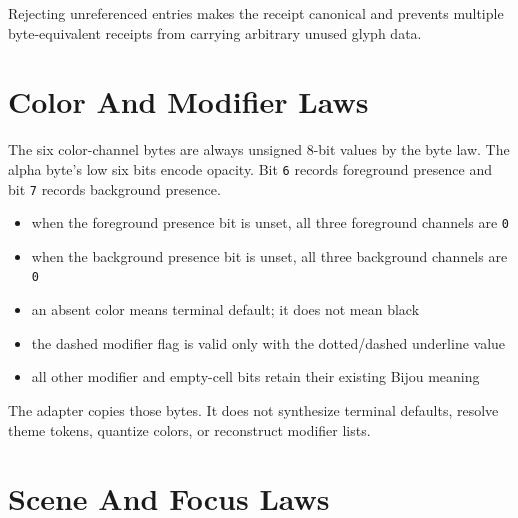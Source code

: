 Rejecting unreferenced entries makes the receipt canonical and prevents multiple byte-equivalent receipts from carrying arbitrary unused glyph data.

\section{Color And Modifier Laws}\label{record-164-color-and-modifier-laws}

The six color-channel bytes are always unsigned 8-bit values by the byte law. The alpha byte's low six bits encode opacity. Bit \texttt{6} records foreground presence and bit \texttt{7} records background presence.

\begin{itemize}
\tightlist
\item
  when the foreground presence bit is unset, all three foreground channels are \texttt{0}
\item
  when the background presence bit is unset, all three background channels are \texttt{0}
\item
  an absent color means terminal default; it does not mean black
\item
  the dashed modifier flag is valid only with the dotted/dashed underline value
\item
  all other modifier and empty-cell bits retain their existing Bijou meaning
\end{itemize}

The adapter copies those bytes. It does not synthesize terminal defaults, resolve theme tokens, quantize colors, or reconstruct modifier lists.

\section{Scene And Focus Laws}\label{record-164-scene-and-focus-laws}

